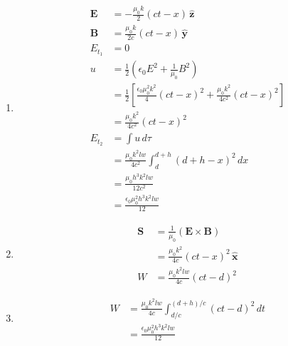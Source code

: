 \documentclass{article}
\renewcommand{\vec}[1]{\boldsymbol{\mathbf{#1}}}
\newcommand{\uvec}[1]{\hat{\vec{#1}}}
\begin{document}
\begin{enumerate}
  \item

        \begin{align*}
          \vec{E} & = -\frac{\mu_0 k}{2} (c t - x) \,\uvec{z}                                                                       \\
          \vec{B} & = \frac{\mu_0 k}{2 c} (c t - x) \,\uvec{y}                                                                      \\
          E_{t_1} & = 0                                                                                                             \\
          u       & = \frac{1}{2} \left( \epsilon_0 E^2 + \frac{1}{\mu_0} B^2 \right)                                               \\
                  & = \frac{1}{2} \left[ \frac{\epsilon_0 \mu_0^2 k^2}{4} (c t - x)^2 + \frac{\mu_0 k^2}{4 c^2} (c t - x)^2 \right] \\
                  & = \frac{\mu_0 k^2}{4 c^2} (c t - x)^2                                                                           \\
          E_{t_2} & = \int u \,d \tau                                                                                               \\
                  & = \frac{\mu_0 k^2 l w}{4 c^2} \int_d^{d + h} (d + h - x)^2 \,d x                                                \\
                  & = \frac{\mu_0 h^3 k^2 l w}{12 c^2}                                                                              \\
                  & = \frac{\epsilon_0 \mu_0^2 h^3 k^2 l w}{12}
        \end{align*}

  \item

        \begin{align*}
          \vec{S} & = \frac{1}{\mu_0} (\vec{E} \times \vec{B})     \\
                  & = \frac{\mu_0 k^2}{4 c} (c t - x)^2 \,\uvec{x} \\
          W       & = \frac{\mu_0 k^2 l w}{4 c} (c t - d)^2
        \end{align*}

  \item

        \begin{align*}
          W & = \frac{\mu_0 k^2 l w}{4 c} \int_{d / c}^{(d + h) / c} (c t - d)^2 \,d t \\
            & = \frac{\epsilon_0 \mu_0^2 h^3 k^2 l w}{12}
        \end{align*}
\end{enumerate}
\end{document}
